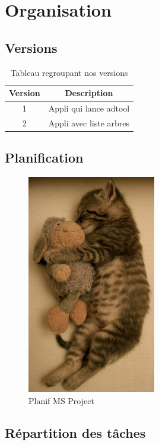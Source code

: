 \section{Organisation}
	\subsection{Versions}
		\begin{table}[h!]
			\begin{center}
			\begin{tabular}{|c|c|}
				\hline
				Version & Description\\
				\hline
				1 & Appli qui lance adtool\\
				\hline
				2 & Appli avec liste arbres\\
				\hline
			\end{tabular}
			\end{center}
			\caption{Tableau regroupant nos versions}
		\end{table}

	\subsection{Planification}
		\begin{figure}
			\begin{center}
				\includegraphics[width=0.5\textwidth]{figure/planif.jpg}
			\end{center}
			\caption{Planif MS Project}
			\label{fig:planif}
		\end{figure}


	\subsection{Répartition des tâches}

